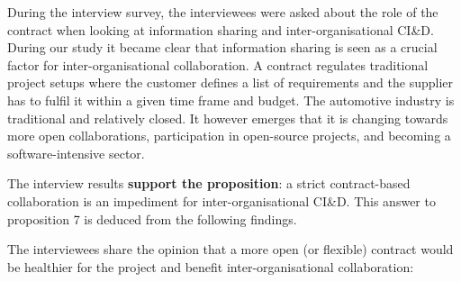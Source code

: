 During the interview survey, the interviewees were asked about the role of the contract when looking at information sharing and inter-organisational CI\&D. During our study it became clear that information sharing is seen as a crucial factor for inter-organisational collaboration. A contract regulates traditional project setups where the customer defines a list of requirements and the supplier has to fulfil it within a given time frame and budget. The automotive industry is traditional and relatively closed. It however emerges that it is changing towards more open collaborations, %
participation in open-source projects, and becoming a software-intensive sector. 



The interview results {\bf support the proposition}: a strict contract-based collaboration is an impediment for inter-organisational CI\&D. This answer to proposition 7 is deduced from the following findings.


 The interviewees share the opinion that a more open (or flexible) contract would be healthier for the project and benefit inter-organisational collaboration: 

